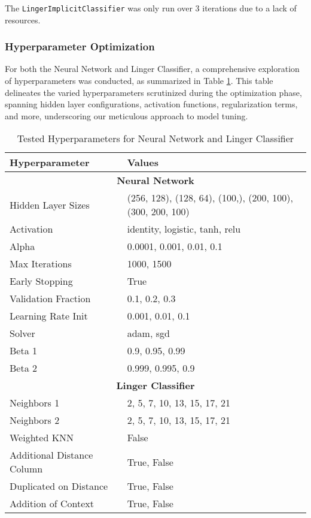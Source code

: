 \documentclass[a4paper, 12pt]{report}
\begin{document}
The \texttt{LingerImplicitClassifier} was only run over 3 iterations due to a lack of resources.

\subsubsection{Hyperparameter Optimization}
For both the Neural Network and Linger Classifier, a comprehensive exploration of hyperparameters was conducted, 
as summarized in Table \ref{tab:hyperparameters}. This table delineates the varied hyperparameters scrutinized during the optimization phase, 
spanning hidden layer configurations, activation functions, regularization terms, and more, underscoring our meticulous approach to model 
tuning.

\begin{table}
    \centering
    \caption{Tested Hyperparameters for Neural Network and Linger Classifier}
    \label{tab:hyperparameters}
    \begin{tabular}{|l|l|}
    \hline
    \textbf{Hyperparameter} & \textbf{Values} \\ \hline
    \multicolumn{2}{|c|}{\textbf{Neural Network}} \\ \hline
    Hidden Layer Sizes & (256, 128), (128, 64), (100,), (200, 100), (300, 200, 100) \\ \hline
    Activation & identity, logistic, tanh, relu \\ \hline
    Alpha & 0.0001, 0.001, 0.01, 0.1 \\ \hline
    Max Iterations & 1000, 1500 \\ \hline
    Early Stopping & True \\ \hline
    Validation Fraction & 0.1, 0.2, 0.3 \\ \hline
    Learning Rate Init & 0.001, 0.01, 0.1 \\ \hline
    Solver & adam, sgd \\ \hline
    Beta 1 & 0.9, 0.95, 0.99 \\ \hline
    Beta 2 & 0.999, 0.995, 0.9 \\ \hline
    \multicolumn{2}{|c|}{\textbf{Linger Classifier}} \\ \hline
    Neighbors 1 & 2, 5, 7, 10, 13, 15, 17, 21 \\ \hline
    Neighbors 2 & 2, 5, 7, 10, 13, 15, 17, 21 \\ \hline
    Weighted KNN & False \\ \hline
    Additional Distance Column & True, False \\ \hline
    Duplicated on Distance & True, False \\ \hline
    Addition of Context & True, False \\ \hline
    \end{tabular}
\end{table}
\clearpage
\end{document}
